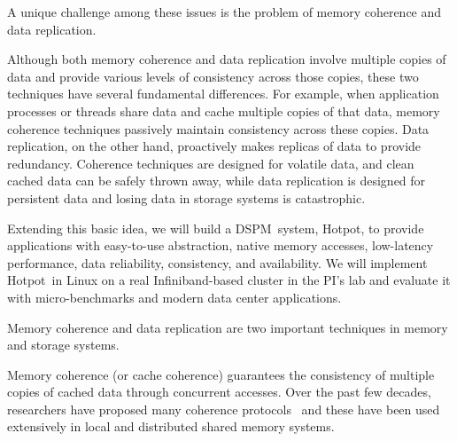 \documentclass[sigconf]{acmart}
\newcommand{\dsnvm}{DSPM}
\newcommand{\nvm}{PM}
\newcommand{\hotpot}{Hotpot}
\begin{document}
A unique challenge among these issues is the problem of memory coherence and data replication. 

Although both memory coherence and data replication involve multiple copies of data
and provide various levels of consistency across those copies,
these two techniques have several fundamental differences.
For example, 
when application processes or threads share data and cache multiple copies of that data, 
memory coherence techniques passively maintain consistency across these copies.
Data replication, on the other hand, proactively makes replicas of data to provide redundancy.
Coherence techniques are designed for volatile data,
and clean cached data can be safely thrown away,
while data replication is designed for persistent data and losing data in storage systems is catastrophic.
\fi








Extending this basic idea, we will build a \dsnvm\ system, \hotpot, 
to provide applications with easy-to-use abstraction, native memory accesses, 
low-latency performance, data reliability, consistency, and availability.
We will implement \hotpot\ in Linux on a real Infiniband-based cluster in the PI's lab
and evaluate it with micro-benchmarks and modern data center applications.

Memory coherence and data replication are two important techniques in memory and storage systems.

Memory coherence (or cache coherence) guarantees the consistency of multiple copies of cached data through concurrent accesses.
Over the past few decades, researchers have proposed many coherence 
protocols~\cite{Gharachorloo90-ISCA,Gibbons91-SPAA,Kontothanassis97-ISCA,Katz85-ISCA,Gamsa99-OSDI,Srbljic97-IEEE,Mellor-Crummey91-ACM,Tartalja95-HICSS,Gharachorloo90-ISCA,Keleher92-ISCA,Lenoski90-ISCA,Dubois88-IEEE,Li89-ACM,Tomasevic94-IEEE}
and these have been used extensively in local and distributed shared memory systems.
\end{document}
